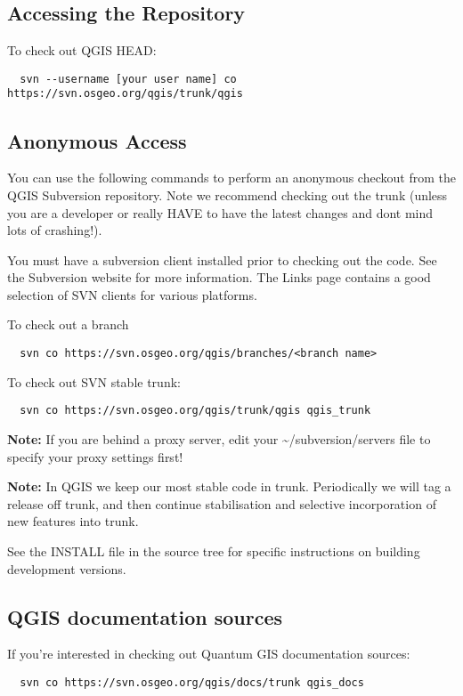 \subsection{Accessing the Repository}
To check out QGIS HEAD:

\begin{verbatim}
  svn --username [your user name] co https://svn.osgeo.org/qgis/trunk/qgis
\end{verbatim}

\subsection{Anonymous Access}
You can use the following commands to perform an anonymous checkout from the QGIS Subversion repository. 
Note we recommend checking out the trunk (unless you are a developer or really HAVE to have the latest 
changes and dont mind lots of crashing!).

You must have a subversion client installed prior to checking out the code. See the Subversion website 
for more information. The Links page contains a good selection of SVN clients for various platforms.

To check out a branch

\begin{verbatim}
  svn co https://svn.osgeo.org/qgis/branches/<branch name>
\end{verbatim}
To check out SVN stable trunk:

\begin{verbatim}
  svn co https://svn.osgeo.org/qgis/trunk/qgis qgis_trunk
\end{verbatim}

\textbf{Note:} If you are behind a proxy server, edit your \~{}/subversion/servers file to specify 
your proxy settings first!

\textbf{Note:} In QGIS we keep our most stable code in trunk. Periodically we will tag a release 
off trunk, and then continue stabilisation and selective incorporation of new features into trunk.

See the INSTALL file in the source tree for specific instructions on building development versions. 

\subsection{QGIS documentation sources}
If you're interested in checking out Quantum GIS documentation sources:

\begin{verbatim}
  svn co https://svn.osgeo.org/qgis/docs/trunk qgis_docs
\end{verbatim}

